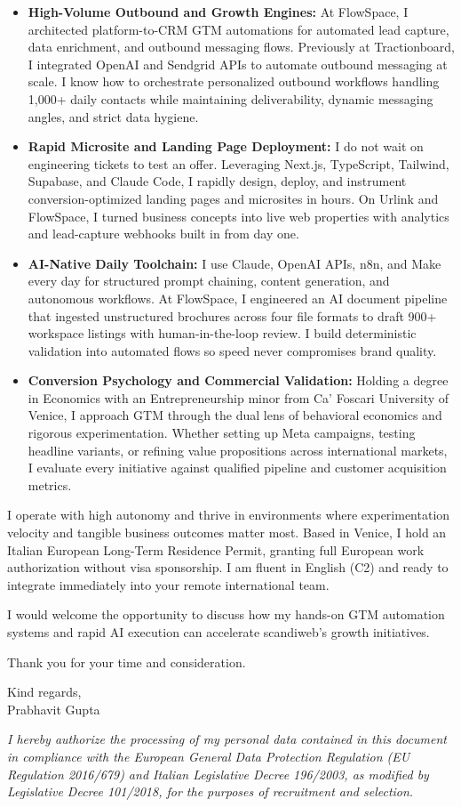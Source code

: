 \documentclass[11pt,a4paper]{article}
\begin{document}
\begin{itemize}
 \item \textbf{High-Volume Outbound and Growth Engines:} At FlowSpace, I architected platform-to-CRM GTM automations for automated lead capture, data enrichment, and outbound messaging flows. Previously at Tractionboard, I integrated OpenAI and Sendgrid APIs to automate outbound messaging at scale. I know how to orchestrate personalized outbound workflows handling 1,000+ daily contacts while maintaining deliverability, dynamic messaging angles, and strict data hygiene.
 \item \textbf{Rapid Microsite and Landing Page Deployment:} I do not wait on engineering tickets to test an offer. Leveraging Next.js, TypeScript, Tailwind, Supabase, and Claude Code, I rapidly design, deploy, and instrument conversion-optimized landing pages and microsites in hours. On Urlink and FlowSpace, I turned business concepts into live web properties with analytics and lead-capture webhooks built in from day one.
 \item \textbf{AI-Native Daily Toolchain:} I use Claude, OpenAI APIs, n8n, and Make every day for structured prompt chaining, content generation, and autonomous workflows. At FlowSpace, I engineered an AI document pipeline that ingested unstructured brochures across four file formats to draft 900+ workspace listings with human-in-the-loop review. I build deterministic validation into automated flows so speed never compromises brand quality.
 \item \textbf{Conversion Psychology and Commercial Validation:} Holding a degree in Economics with an Entrepreneurship minor from Ca' Foscari University of Venice, I approach GTM through the dual lens of behavioral economics and rigorous experimentation. Whether setting up Meta campaigns, testing headline variants, or refining value propositions across international markets, I evaluate every initiative against qualified pipeline and customer acquisition metrics.
\end{itemize}

I operate with high autonomy and thrive in environments where experimentation velocity and tangible business outcomes matter most. Based in Venice, I hold an Italian European Long-Term Residence Permit, granting full European work authorization without visa sponsorship. I am fluent in English (C2) and ready to integrate immediately into your remote international team.

I would welcome the opportunity to discuss how my hands-on GTM automation systems and rapid AI execution can accelerate scandiweb's growth initiatives.

Thank you for your time and consideration.

\vspace{3pt}
Kind regards,\\[2pt]
Prabhavit Gupta

\vspace{8pt}
{\scriptsize\textit{I hereby authorize the processing of my personal data contained in this document in compliance with the European General Data Protection Regulation (EU Regulation 2016/679) and Italian Legislative Decree 196/2003, as modified by Legislative Decree 101/2018, for the purposes of recruitment and selection.}}
\end{document}
